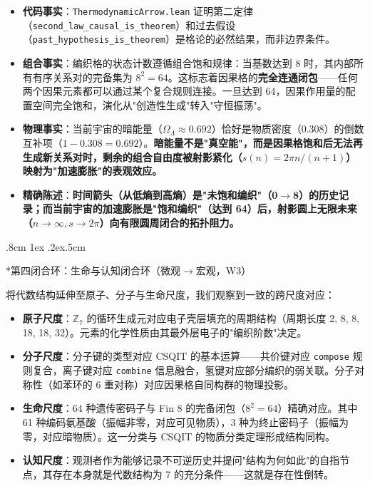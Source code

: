 \documentclass[aps,prd,twocolumn,nofootinbib,floatfix]{revtex4-2}
\makeatletter
\def\subsubsection{%
  \@startsection{subsubsection}{3}{\z@}
    {.8cm \@plus1ex \@minus .2ex}{.5cm}
    {\normalfont\normalsize\bfseries\itshape\raggedright}%
}
\makeatother
\begin{document}
\begin{itemize}
    \item \textbf{代码事实}：\texttt{ThermodynamicArrow.lean} 证明第二定律（\texttt{second\_law\_causal\_is\_theorem}）和过去假设（\texttt{past\_hypothesis\_is\_theorem}）是格论的必然结果，而非边界条件。
    \item \textbf{组合事实}：编织格的状态计数遵循组合饱和规律：当基数达到 8 时，其内部所有有序关系对的完备集为 $8^2 = 64$。这标志着因果格的\textbf{完全连通闭包}——任何两个因果元素都可以通过某个复合规则连接。一旦达到 64，因果作用量的配置空间完全饱和，演化从"创造性生成"转入"守恒振荡"。
    \item \textbf{物理事实}：当前宇宙的暗能量（$\Omega_\Lambda \approx 0.692$）恰好是物质密度（0.308）的倒数互补项（$1 - 0.308 = 0.692$）。\textbf{暗能量不是"真空能"，而是因果格饱和后无法再生成新关系对时，剩余的组合自由度被射影紧化（$s(n) = 2\pi n/(n+1)$）映射为"加速膨胀"的表观效应。}
    \item \textbf{精确陈述}：\textbf{时间箭头（从低熵到高熵）是"未饱和编织"（0$\to$8）的历史记录；而当前宇宙的加速膨胀是"饱和编织"（达到 64）后，射影圆上无限未来（$n \to \infty, s \to 2\pi$）向有限圆周闭合的拓扑阻力。}
\end{itemize}

\subsubsection*{第四闭合环：生命与认知闭合环（微观$\to$宏观，W3）}

将代数结构延伸至原子、分子与生命尺度，我们观察到一致的跨尺度对应：

\begin{itemize}
    \item \textbf{原子尺度}：$\mathbb{Z}_7$ 的循环生成元对应电子壳层填充的周期结构（周期长度 2, 8, 8, 18, 18, 32）。元素的化学性质由其最外层电子的"编织阶数"决定。
    \item \textbf{分子尺度}：分子键的类型对应 CSQIT 的基本运算——共价键对应 \texttt{compose} 规则复合，离子键对应 \texttt{combine} 信息融合，氢键对应部分编织的弱关联。分子对称性（如苯环的 6 重对称）对应因果格自同构群的物理投影。
    \item \textbf{生命尺度}：64 种遗传密码子与 Fin 8 的完备闭包（$8^2 = 64$）精确对应。其中 61 种编码氨基酸（振幅非零，对应可见物质），3 种为终止密码子（振幅为零，对应暗物质）。这一分类与 CSQIT 的物质分类定理形成结构同构。
    \item \textbf{认知尺度}：观测者作为能够记录不可逆历史并提问"结构为何如此"的自指节点，其存在本身就是代数结构为 7 的充分条件——这就是存在性倒转。
\end{itemize}
\end{document}
